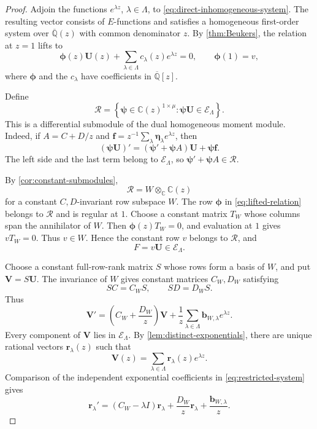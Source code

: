 \documentclass[11pt]{article}
\numberwithin{equation}{section}
\theoremstyle{definition}
\theoremstyle{remark}
\newcommand{\C}{\mathbb C}
\newcommand{\Qbar}{\overline{\mathbb Q}}
\newcommand{\Ecal}{\mathcal E}
\newcommand{\Rcal}{\mathcal R}
\begin{document}
\begin{proof}
Adjoin the functions $e^{\lambda z}$, $\lambda\in\Lambda$, to
\eqref{eq:direct-inhomogeneous-system}.  The resulting vector consists of
$E$-functions and satisfies a homogeneous first-order system over
$\Qbar(z)$ with common denominator $z$.  By \cref{thm:Beukers}, the
relation at $z=1$ lifts to
\begin{equation}\label{eq:lifted-relation}
  \boldsymbol\phi(z)\mathbf U(z)
  +\sum_{\lambda\in\Lambda}c_\lambda(z)e^{\lambda z}=0,
  \qquad
  \boldsymbol\phi(1)=v,
\end{equation}
where $\boldsymbol\phi$ and the $c_\lambda$ have coefficients in
$\Qbar[z]$.

Define
\begin{equation}\label{eq:relation-module}
  \Rcal=
  \left\{
    \boldsymbol\psi\in\C(z)^{1\times\mu}:
    \boldsymbol\psi\mathbf U\in\Ecal_\Lambda
  \right\}.
\end{equation}
This is a differential submodule of the dual homogeneous moment module.
Indeed, if $A=C+D/z$ and
$\mathbf f=z^{-1}\sum_\lambda\boldsymbol\eta_\lambda e^{\lambda z}$,
then
\[
  (\boldsymbol\psi\mathbf U)'
  =(\boldsymbol\psi'+\boldsymbol\psi A)\mathbf U
   +\boldsymbol\psi\mathbf f.
\]
The left side and the last term belong to $\Ecal_\Lambda$, so
$\boldsymbol\psi'+\boldsymbol\psi A\in\Rcal$.

By \cref{cor:constant-submodules},
\[
  \Rcal=W\otimes_\C\C(z)
\]
for a constant $C,D$-invariant row subspace $W$.  The row
$\boldsymbol\phi$ in \eqref{eq:lifted-relation} belongs to $\Rcal$ and is
regular at $1$.  Choose a constant matrix $T_W$ whose columns span the
annihilator of $W$.  Then $\boldsymbol\phi(z)T_W=0$, and evaluation at
$1$ gives $vT_W=0$.  Thus $v\in W$.  Hence the constant row
$v$ belongs to $\Rcal$, and
\begin{equation}\label{eq:F-in-E}
  F=v\mathbf U\in\Ecal_\Lambda.
\end{equation}

Choose a constant full-row-rank matrix $S$ whose rows form a basis of $W$,
and put $\mathbf V=S\mathbf U$.  The invariance of $W$ gives constant
matrices $C_W,D_W$ satisfying
\[
  SC=C_WS,
  \qquad
  SD=D_WS.
\]
Thus
\begin{equation}\label{eq:restricted-system}
  \mathbf V'
  =\left(C_W+\frac{D_W}{z}\right)\mathbf V
   +\frac1z\sum_{\lambda\in\Lambda}
       \mathbf b_{W,\lambda}e^{\lambda z}.
\end{equation}
Every component of $\mathbf V$ lies in $\Ecal_\Lambda$.  By
\cref{lem:distinct-exponentials}, there are unique rational vectors
$\mathbf r_\lambda(z)$ such that
\begin{equation}\label{eq:V-expansion}
  \mathbf V(z)=\sum_{\lambda\in\Lambda}
    \mathbf r_\lambda(z)e^{\lambda z}.
\end{equation}
Comparison of the independent exponential coefficients in
\eqref{eq:restricted-system} gives
\begin{equation}\label{eq:r-equation}
  \mathbf r_\lambda'
  =(C_W-\lambda I)\mathbf r_\lambda
   +\frac{D_W}{z}\mathbf r_\lambda
   +\frac{\mathbf b_{W,\lambda}}{z}.
\end{equation}


\end{proof}
\end{document}
